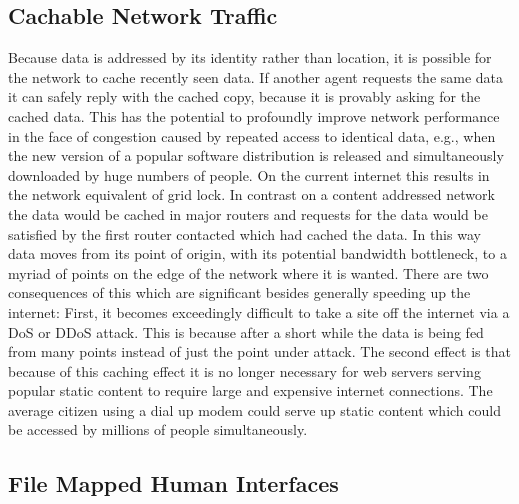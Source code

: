 \documentclass[british,english]{article}
\begin{document}
\subsection{Cachable Network Traffic}

Because data is addressed by its identity rather than location, it
is possible for the network to cache recently seen data. If another
agent requests the same data it can safely reply with the cached copy,
because it is provably asking for the cached data. This has the potential
to profoundly improve network performance in the face of congestion
caused by repeated access to identical data, e.g., when the new version
of a popular software distribution is released and simultaneously
downloaded by huge numbers of people. On the current internet this
results in the network equivalent of grid lock. In contrast on a content
addressed network the data would be cached in major routers and requests
for the data would be satisfied by the first router contacted which
had cached the data. In this way data moves from its point of origin,
with its potential bandwidth bottleneck, to a myriad of points on
the edge of the network where it is wanted. There are two consequences
of this which are significant besides generally speeding up the internet:
First, it becomes exceedingly difficult to take a site off the internet
via a DoS or DDoS attack. This is because after a short while the
data is being fed from many points instead of just the point under
attack. The second effect is that because of this caching effect it
is no longer necessary for web servers serving popular static content
to require large and expensive internet connections. The average citizen
using a dial up modem could serve up static content which could be
accessed by millions of people simultaneously.


\subsection{File Mapped Human Interfaces}
\end{document}

